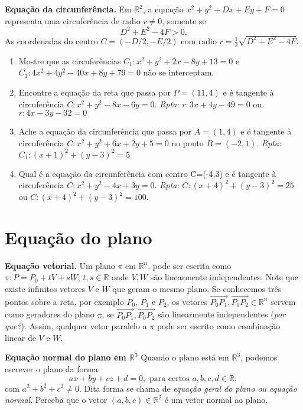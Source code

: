 \documentclass{article}
\theoremstyle{plain}
\theoremstyle{definition}
\theoremstyle{remark}
\begin{document}
{\bf Equação da circunferência. } 
Em $\mathbb{R}^{2}$, a equação $x^2+y^2+Dx+Ey+F=0$ representa uma circuferência de radio 
$r\neq0$, somente se $$D^{2}+E^{2}-4F>0.$$
As coordenadas do centro $C=(-D/2, -E/2)$ com radio 
$r=\frac{1}{2} \sqrt{D^{2}+E^{2}-4F}$. 

\begin{enumerate}
  \item Mostre que as circuferências $C_1: x^2+y^2+2x-8y+13=0$
  e $C_1: 4x^2+4y^2-40x+8y+79=0$ não se interceptam. 
  \item Encontre a equação da reta que passa por $P=(11,4)$
  e é tangente à circuferência $C: x^2+y^2-8x-6y=0$.
  {\it Rpta: }$ r: 3x+4y-49=0$ ou $r: 4x-3y-32=0$ 
  \item Ache a equação da circunferência que passa por $A=(1,4)$
  e é tangente à circuferência $C: x^2+y^2+6x+2y+5=0$ 
  no ponto $B=(-2,1)$. {\it Rpta: } $C_1: (x+1)^2+(y-3)^2=5$ 
  \item Qual é a equação da circunferência com centro C=(-4,3)
  e é tangente à circuferência $C: x^2+y^2-4x+3y=0$.
  {\it Rpta:}  $C: (x+4)^2+(y-3)^2=25$ ou $C: (x+4)^2+(y-3)^2=100$.
\end{enumerate}
  
\section*{Equação do plano} 

{\bf Equação vetorial.} 
 Um plano $\pi$ em $\mathbb{R}^{n}$, pode ser escrita como 
 $\pi: P=P_{0}+tV+sW$, $t, s \in \mathbb{R}$ 
 onde $V, W$ são linearmente independentes. 
 Note que existe infinitos vetores $V$ e $W$ que geram o mesmo plano. 
 Se conhecemos três pontos sobre a reta, por exemplo $P_{0}$, $P_1$
 e $P_2$, os vetores 
 $\overrightarrow{P_0P_1}, \overrightarrow{P_0P_2} \in \mathbb{R}^{n}$ 
 servem como geradores do plano $\pi$, se
 $\overrightarrow{P_0P_1}, \overrightarrow{P_0P_2}$ são linearmente independentes ({\it por que?}). 
 Assim, qualquer vetor paralelo a $\pi$ pode ser escrito como combinação linear de $V$ e $W$.
 
 {\bf Equação normal do plano em $\mathbb{R}^{3}$}
 Quando o plano está em $\mathbb{R}^{3}$, podemos escrever o plano da 
 forma 
$$ax+by+cz+d=0, \text{ para certos } a,b,c, d \in \mathbb{R}, $$ 
com $a^{2}+b^{2}+c^2\neq0$. Dita forma se chama de 
 {\it equação geral do plano ou equação normal}. Perceba que o vetor 
 $(a,b,c) \in \mathbb{R}^{2}$ é um vetor normal ao plano. 
 
\end{document}
